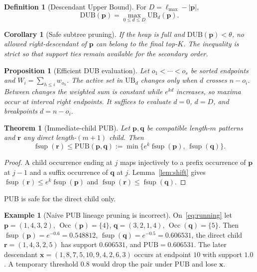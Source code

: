 \documentclass[preprint,12pt]{elsarticle}
\DeclareMathOperator{\fsup}{fsup}
\DeclareMathOperator{\Occ}{Occ}
\newcommand{\DUB}{\mathrm{DUB}}
\newcommand{\PUB}{\mathrm{PUB}}
\newcommand{\UB}{\mathrm{UB}}
\theoremstyle{plain}
\newtheorem{theorem}{Theorem}
\newtheorem{proposition}{Proposition}
\newtheorem{corollary}{Corollary}
\theoremstyle{definition}
\newtheorem{definition}{Definition}
\newtheorem{example}{Example}
\theoremstyle{remark}
\begin{document}
\begin{definition}[Descendant Upper Bound]
\label{def:dub}
For $D=\ell_{\max}-|\mathbf{p}|$,
\begin{equation}
\label{eq:dub}
\DUB(\mathbf{p})=\max_{0\le d\le D}\UB_d(\mathbf{p}).
\end{equation}
\end{definition}

\begin{corollary}[Safe subtree pruning]
\label{cor:dub}
If the heap is full and $\DUB(\mathbf{p})<\theta$, no allowed right-descendant of $\mathbf{p}$ can belong to the final top-$K$. The inequality is strict so that support ties remain available for the secondary order.
\end{corollary}

\begin{proposition}[Efficient DUB evaluation]
\label{prop:dub}
Let $o_1<\cdots<o_s$ be sorted endpoints and $W_i=\sum_{h\le i}w_{o_h}$. The active set in $\UB_d$ changes only when $d$ crosses $n-o_i$. Between changes the weighted sum is constant while $e^{kd}$ increases, so maxima occur at interval right endpoints. It suffices to evaluate $d=0$, $d=D$, and breakpoints $d=n-o_i$.
\end{proposition}

\begin{theorem}[Immediate-child PUB]
\label{thm:pub}
Let $\mathbf{p},\mathbf{q}$ be compatible length-$m$ patterns and $\mathbf{r}$ any direct length-$(m+1)$ child. Then
\begin{equation}
\label{eq:pub}
\fsup(\mathbf{r})\le \PUB(\mathbf{p},\mathbf{q})
:=\min\bigl\{e^{k}\fsup(\mathbf{p}),\,\fsup(\mathbf{q})\bigr\}.
\end{equation}
\end{theorem}
\begin{proof}
A child occurrence ending at $j$ maps injectively to a prefix occurrence of $\mathbf{p}$ at $j-1$ and a suffix occurrence of $\mathbf{q}$ at $j$. Lemma~\ref{lem:shift} gives $\fsup(\mathbf{r})\le e^{k}\fsup(\mathbf{p})$ and $\fsup(\mathbf{r})\le\fsup(\mathbf{q})$.
\end{proof}

PUB is safe for the direct child only.

\begin{example}[Naive PUB lineage pruning is incorrect]
\label{ex:pub}
On~\eqref{eq:running} let $\mathbf{p}=(1,4,3,2)$, $\Occ(\mathbf{p})=\{4\}$, $\mathbf{q}=(3,2,1,4)$, $\Occ(\mathbf{q})=\{5\}$. Then $\fsup(\mathbf{p})=e^{-0.6}=0.548812$, $\fsup(\mathbf{q})=e^{-0.5}=0.606531$, the direct child $\mathbf{r}=(1,4,3,2,5)$ has support $0.606531$, and $\PUB=0.606531$. The later descendant $\mathbf{x}=(1,8,7,5,10,9,4,2,6,3)$ occurs at endpoint $10$ with support $1.0$. A temporary threshold $0.8$ would drop the pair under $\PUB$ and lose $\mathbf{x}$.
\end{example}
\end{document}
